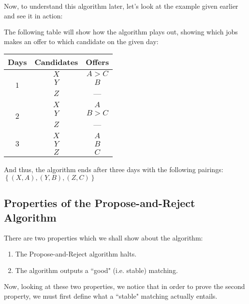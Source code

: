 \documentclass[openany]{book}
\begin{document}
Now, to understand this algorithm later, let's look at the example given earlier and see it in action:
\begin{example}
	The following table will show how the algorithm plays out, showing which jobs makes an offer to which candidate on the given day:
	
	\begin{center}
		\begin{tabular}{|c|c|c|}
			\hline
			Days & Candidates & Offers \\
			\hline
			\multirow{3}{2em}{\centering $1$} & $X$ & $A > C$ \\
			& $Y$ & $B$ \\
			& $Z$ & --- \\
			\hline
			\multirow{3}{2em}{\centering $2$} & $X$ & $A$ \\
			& $Y$ & $B > C$ \\
			& $Z$ & --- \\
			\hline
			\multirow{3}{2em}{\centering $3$} & $X$ & $A$ \\
			& $Y$ & $B$ \\
			& $Z$ & $C$ \\
			\hline
		\end{tabular}
	\end{center}

	And thus, the algorithm ends after three days with the following pairings: $\left\{  (X, A), (Y, B), (Z, C)\right\}$
\end{example}

\subsection{Properties of the Propose-and-Reject Algorithm}

There are two properties which we shall show about the algorithm:
\begin{enumerate}
	\item The Propose-and-Reject algorithm halts.
	\item The algorithm outputs a ``good" (i.e. stable) matching.
\end{enumerate}

Now, looking at these two properties, we notice that in order to prove the second property, we must first define what a ``stable" matching actually entails.
\end{document}
